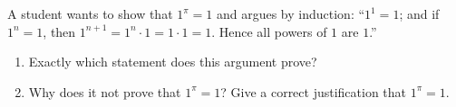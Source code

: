 A student wants to show that $1^{\pi}=1$ and argues by induction: ``$1^1=1$; and if $1^n=1$, then $1^{n+1}=1^n\cdot1=1\cdot1=1$. Hence all powers of $1$ are $1$.''
\begin{enumerate}
\item[(a)] Exactly which statement does this argument prove?
\item[(b)] Why does it not prove that $1^{\pi}=1$? Give a correct justification that $1^{\pi}=1$.
\end{enumerate}
